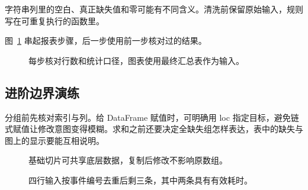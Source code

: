 \begin{pitfall}
字符串列里的空白、真正缺失值和零可能有不同含义。清洗前保留原始输入，规则写在可重复执行的函数里。
\end{pitfall}
图~\ref{fig:chapter-16-flow} 串起报表步骤，后一步使用前一步核对过的结果。
\begin{figure}[htbp]
  \centering
  \caption{每步核对行数和统计口径，图表使用最终汇总表作为输入。}
  \label{fig:chapter-16-flow}
\end{figure}

\subsection*{进阶边界演练}
分组前先核对索引与列。给 DataFrame 赋值时，可明确用 loc 指定目标，避免链式赋值让修改意图变得模糊。求和之前还要决定全缺失组怎样表达，表中的缺失与图上的显示要能互相说明。

\begin{figure}[htbp]
\centering
{}
\caption{基础切片可共享底层数据，复制后修改不影响原数组。}
\label{fig:visual-ch16}
\end{figure}

\begin{figure}[htbp]
\centering
{}
\caption{四行输入按事件编号去重后剩三条，其中两条具有有效耗时。}
\label{fig:visual-quality}
\end{figure}
